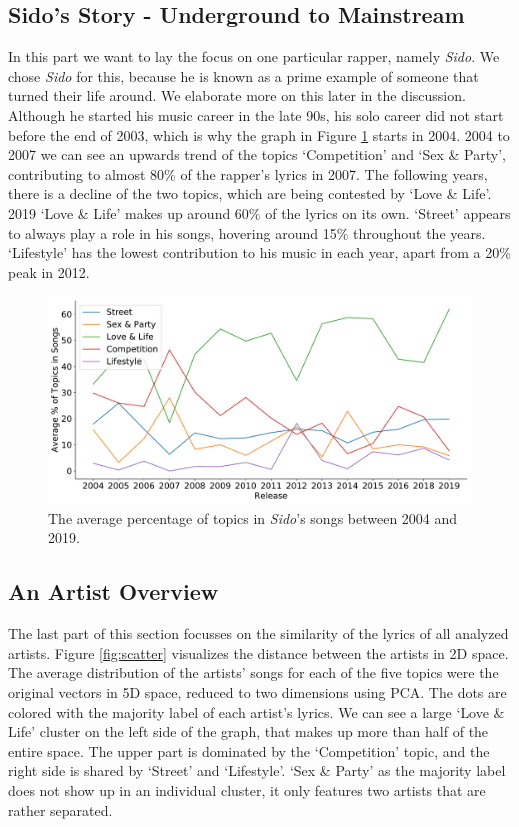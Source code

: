 \documentclass[conference]{IEEEtran}
\begin{document}
\subsection{Sido's Story - Underground to Mainstream}
In this part we want to lay the focus on one particular rapper, namely \textit{Sido}. We chose \textit{Sido} for this, because he is known as a prime example of someone that turned their life around. We elaborate more on this later in the discussion. Although he started his music career in the late 90s, his solo career did not start before the end of 2003, which is why the graph in Figure \ref{fig:sido} starts in 2004. 2004 to 2007 we can see an upwards trend of the topics {\lq}Competition{\rq} and {\lq}Sex \& Party{\rq}, contributing to almost 80\% of the rapper's lyrics in 2007. The following years, there is a decline of the two topics, which are being contested by {\lq}Love \& Life{\rq}. 2019 {\lq}Love \& Life{\rq} makes up around 60\% of the lyrics on its own. {\lq}Street{\rq} appears to always play a role in his songs, hovering around 15\% throughout the years. {\lq}Lifestyle{\rq} has the lowest contribution to his music in each year, apart from a 20\% peak in 2012.

\begin{figure}[!t]
\includegraphics[width=\linewidth]{figures/sido.pdf}
\vspace*{-8mm}
\caption{The average percentage of topics in \textit{Sido}'s songs between 2004 and 2019.}
\label{fig:sido}
\end{figure}

\subsection{An Artist Overview}
The last part of this section focusses on the similarity of the lyrics of all analyzed artists. Figure \ref{fig:scatter} visualizes the distance between the artists in 2D space. The average distribution of the artists' songs for each of the five topics were the original vectors in 5D space, reduced to two dimensions using PCA. The dots are colored with the majority label of each artist's lyrics. We can see a large {\lq}Love \& Life{\rq} cluster on the left side of the graph, that makes up more than half of the entire space. The upper part is dominated by the {\lq}Competition{\rq} topic, and the right side is shared by {\lq}Street{\rq} and {\lq}Lifestyle{\rq}. {\lq}Sex \& Party{\rq} as the majority label does not show up in an individual cluster, it only features two artists that are rather separated.
\end{document}
